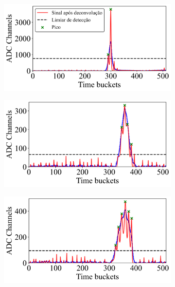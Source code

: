 \documentclass[a4paper,12pt,oneside]{book}
\begin{document}
\begin{figure}[H]
\centering
    \begin{subfigure}[b]{0.48\textwidth}
        \centering
        \includegraphics[scale=0.40]{figs/ex_deconv_1.png}
        \caption{}
        \label{subfig:ex_sinal_deconv_1}
    \end{subfigure}%
    \hfill
    \begin{subfigure}[b]{0.48\textwidth}
        \centering
        \includegraphics[scale=0.40]{figs/ex_deconv_2.png}
        \caption{}
        \label{subfig:ex_sinal_deconv_2}
    \end{subfigure}
    \begin{subfigure}[b]{0.48\textwidth}
        \centering
        \includegraphics[scale=0.40]{figs/ex_deconv_3.png}

\end{subfigure}
\end{figure}
\end{document}
